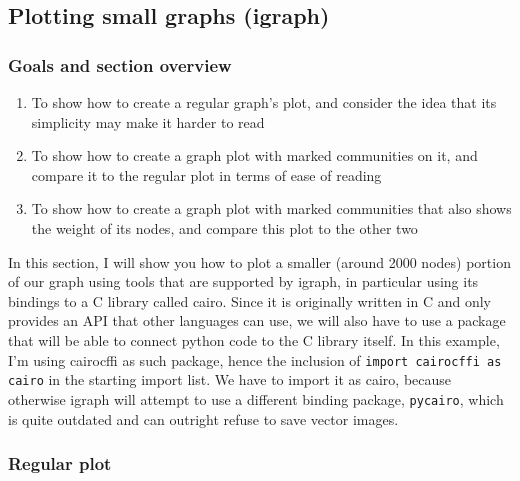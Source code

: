 \documentclass[12pt, a4paper]{article}
\begin{document}
\newpage
\subsection{Plotting small graphs (igraph)}
\subsubsection{Goals and section overview}

\begin{enumerate}
  \item To show how to create a regular graph's plot, and consider the idea that its simplicity may make it harder to read
  \item To show how to create a graph plot with marked communities on it, and compare it to the regular plot in terms of ease of reading
  \item To show how to create a graph plot with marked communities that also shows the weight of its nodes, and compare this plot to the other two
\end{enumerate}


In this section, I will show you how to plot a smaller (around 2000 nodes) portion of our graph using tools that are supported by igraph, in particular using its bindings to a C library called  cairo. Since it is originally written in C and only provides an API that other languages can use, we will also have to use a package that will be able to connect python code to the C library itself. In this example, I'm using cairocffi as such package, hence the inclusion of \texttt{import cairocffi as cairo} in the starting import list. We have to import it as cairo, because otherwise igraph will attempt to use a different binding package, \texttt{pycairo}, which is quite outdated and can outright refuse to save vector images.

\subsubsection{Regular plot}
\end{document}

